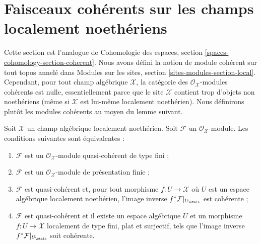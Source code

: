 \section{Faisceaux cohérents sur les champs localement noethériens}
\label{section-coherent-sheaves}

\noindent
Cette section est l'analogue de
Cohomologie des espaces, section
\ref{spaces-cohomology-section-coherent}.
Nous avons défini la notion de module cohérent sur tout topos annelé dans
Modules sur les sites, section \ref{sites-modules-section-local}.
Cependant, pour tout champ algébrique $\mathcal{X}$, la catégorie des
$\mathcal{O}_\mathcal{X}$-modules cohérents est nulle, essentiellement parce que
le site $\mathcal{X}$ contient trop d'objets non noethériens (même si
$\mathcal{X}$ est lui-même localement noethérien). Nous définirons plutôt les
modules cohérents au moyen du lemme suivant.

\begin{lemma}
\label{lemma-coherent-Noetherian}
Soit $\mathcal{X}$ un champ algébrique localement noethérien.
Soit $\mathcal{F}$ un $\mathcal{O}_\mathcal{X}$-module.
Les conditions suivantes sont équivalentes :
\begin{enumerate}
\item $\mathcal{F}$ est un $\mathcal{O}_\mathcal{X}$-module
quasi-cohérent de type fini ;
\item $\mathcal{F}$ est un $\mathcal{O}_\mathcal{X}$-module
de présentation finie ;
\item $\mathcal{F}$ est quasi-cohérent et, pour tout morphisme
$f : U \to \mathcal{X}$ où $U$ est un espace algébrique localement noethérien,
l'image inverse $f^*\mathcal{F}|_{U_\etale}$ est cohérente ;
\item $\mathcal{F}$ est quasi-cohérent et il existe un espace algébrique
$U$ et un morphisme $f : U \to \mathcal{X}$ localement de type fini,
plat et surjectif, tels que l'image inverse $f^*\mathcal{F}|_{U_\etale}$
soit cohérente.
\end{enumerate}
\end{lemma}

